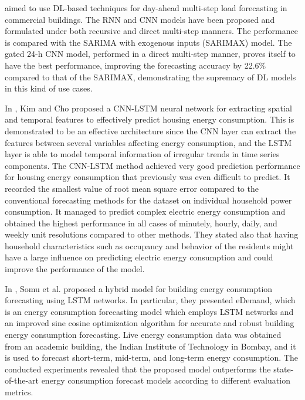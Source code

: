 \cite{CAI20191078} aimed to use DL-based techniques for day-ahead multi-step load forecasting in commercial buildings.
The RNN and CNN models have been proposed and formulated under both recursive and direct multi-step manners.
The performance is compared with the SARIMA with exogenous inputs (SARIMAX) model.
The gated 24-h CNN model, performed in a direct multi-step manner, proves itself to have the best performance, improving the forecasting accuracy by 22.6\% compared to that of the SARIMAX, demonstrating the supremacy of DL models in this kind of use cases.

In \cite{KIM201972}, Kim and Cho proposed a CNN-LSTM neural network for extracting spatial and temporal features to effectively predict housing energy consumption.
This is demonstrated to be an effective architecture since the CNN layer can extract the features between several variables affecting energy consumption, and the LSTM layer is able to model temporal information of irregular trends in time series components.
The CNN-LSTM method achieved very good prediction performance for housing energy consumption that previously was even difficult to predict.
It recorded the smallest value of root mean square error compared to the conventional forecasting methods for the dataset on individual household power consumption.
It managed to predict complex electric energy consumption and obtained the highest performance in all cases of minutely, hourly, daily, and weekly unit resolutions compared to other methods.
They stated also that having household characteristics such as occupancy and behavior of the residents might have a large influence on predicting electric energy consumption and could improve the performance of the model.

In \cite{SOMU2020114131}, Somu et al. proposed a hybrid model for building energy consumption forecasting using LSTM networks.
In particular, they presented eDemand, which is an energy consumption forecasting model which employs LSTM networks and an improved sine cosine optimization algorithm for accurate and robust building energy consumption forecasting.
Live energy consumption data was obtained from an academic building, the Indian Institute of Technology in Bombay, and it is used to forecast short-term, mid-term, and long-term energy consumption.
The conducted experiments revealed that the proposed model outperforms the state-of-the-art energy consumption forecast models according to different evaluation metrics.

